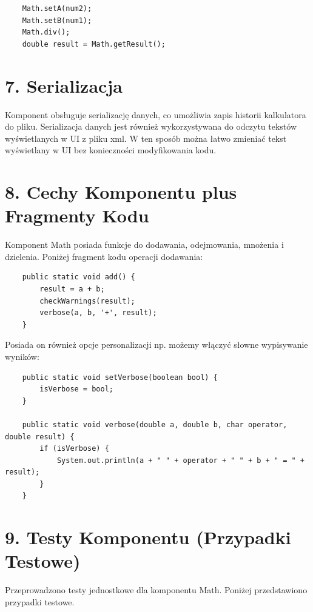 \documentclass{article}
\begin{document}
\begin{verbatim}
    Math.setA(num2);
    Math.setB(num1);
    Math.div();
    double result = Math.getResult();
\end{verbatim}

\section*{7. Serializacja}

Komponent obsługuje serializację danych, co umożliwia zapis historii kalkulatora do pliku.
Serializacja danych jest również wykorzystywana do odczytu tekstów wyświetlanych w UI z pliku xml.
W ten sposób można łatwo zmieniać tekst wyświetlany w UI bez konieczności modyfikowania kodu.

\section*{8. Cechy Komponentu plus Fragmenty Kodu}

Komponent Math posiada funkcje do dodawania, odejmowania, mnożenia i dzielenia. Poniżej fragment kodu operacji dodawania:

\begin{verbatim}
    public static void add() {
        result = a + b;
        checkWarnings(result);
        verbose(a, b, '+', result);
    }
\end{verbatim}
Posiada on również opcje personalizacji np. możemy włączyć słowne wypisywanie wyników:

\begin{verbatim}
    public static void setVerbose(boolean bool) {
        isVerbose = bool;
    }

    public static void verbose(double a, double b, char operator, double result) {
        if (isVerbose) {
            System.out.println(a + " " + operator + " " + b + " = " + result);
        }
    }
\end{verbatim}

\section*{9. Testy Komponentu (Przypadki Testowe)}

Przeprowadzono testy jednostkowe dla komponentu Math. Poniżej przedstawiono przypadki testowe.
\end{document}
